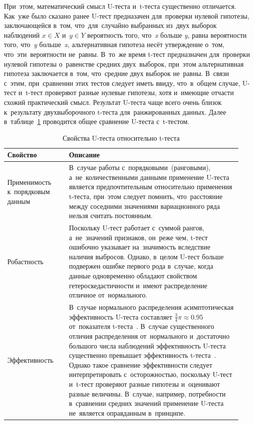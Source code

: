\documentclass[]{scrreprt}
\begin{document}
При~этом, математический смысл U-теста и~t-теста существенно отличается. Как~уже было сказано ранее U-тест предназачен для~проверки нулевой гипотезы, заключающейся в~том, что~для~случайно выбранных из~двух выборок наблюдений ${\textstyle x \in X}$ и~${\textstyle y \in Y}$ вероятность того, что~\textit{x} больше \textit{y}, равна вероятности того, что~\textit{y} больше~\textit{x}, альтернативная гипотеза несёт утверждение о~том, что~эти~вероятности не~равны. В~то~же время t-тест предназначен для~проверки нулевой гипотезы о~равенстве средних двух~выборок, при~этом альтернативная гипотеза заключается в~том, что~средние двух выборок не~равны. В~связи с~этим, при~сравнении этих тестов следует иметь ввиду, что~в~общем случае, U-тест и~t-тест проверяют разные нулевые гипотезы, хотя и~имеющие отчасти схожий практический смысл. Результат U-теста чаще всего очень близок к~результату двухвыборочного t-теста для~ранжированных данных.
Далее в~таблице~\ref{tab:U-test-t-test-comparison} проводится общее сравнение U-теста с~t-тестом.
%
\begin{table}[ht]
	\caption{Свойства U-теста относительно t-теста}  \label{tab:U-test-t-test-comparison}
	\centering
	\begin{tabularx}{\textwidth}{p{0.25\linewidth} p{0.7\linewidth}} 
		\hline
		Свойство&Описание\\
		\hline
		Применимость к~порядковым данным&В~случае работы с~порядковыми~(ранговыми), а~не~количественными данными применение U-теста является предпочтительным относительно применения t-теста, при~этом следует помнить, что~расстояние между соседними значениями вариационного ряда нельзя считать постоянным.\\
		\hline
		Робастность&Поскольку U-тест работает с~суммой рангов, а~не~значений признаков, он~реже чем, t-тест ошибочно указывает на~значимость вследствие наличия выбросов. Однако, в~целом U-тест больше подвержен ошибке первого рода в~случае, когда данные одновременно обладают свойством гетероскедастичности и~имеют распределение отличное от~нормального.\\
		\hline
		Эффективность&В~случае нормального распределения асимптотическая эффективность U-теста составляет $\frac{3}{4}\pi \approx 0.95$ от~показателя t-теста~\cite{U-test-efficiency}. В~случае существенного отличия распределения от~нормального и~достаточно большого числа наблюдений эффективность U-теста существенно превышает эффективность t-теста~\cite{Practical-Nonparametric-Statistics}. Однако такое сравнение эффективности следует интерпретировать с~осторожностью, поскольку U-тест и~t-тест проверяют разные гипотезы и~оценивают разные величины. В~случае, например, потребности в~сравнении средних значений применение U-теста не~является оправданным в~принципе.\\
		\hline
	\end{tabularx}
\end{table}
%
\end{document}
